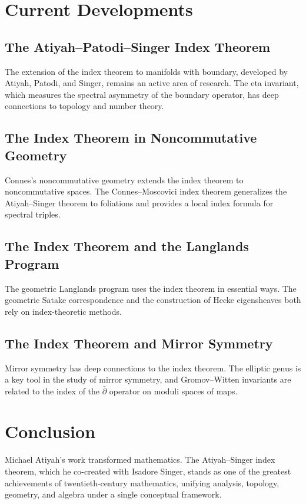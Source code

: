 \section{Current Developments}

\subsection{The Atiyah--Patodi--Singer Index Theorem}

The extension of the index theorem to manifolds with boundary, developed by Atiyah, Patodi, and Singer, remains an active area of research. The eta invariant, which measures the spectral asymmetry of the boundary operator, has deep connections to topology and number theory.

\subsection{The Index Theorem in Noncommutative Geometry}

Connes's noncommutative geometry extends the index theorem to noncommutative spaces. The Connes--Moscovici index theorem generalizes the Atiyah--Singer theorem to foliations and provides a local index formula for spectral triples.

\subsection{The Index Theorem and the Langlands Program}

The geometric Langlands program uses the index theorem in essential ways. The geometric Satake correspondence and the construction of Hecke eigensheaves both rely on index-theoretic methods.

\subsection{The Index Theorem and Mirror Symmetry}

Mirror symmetry has deep connections to the index theorem. The elliptic genus is a key tool in the study of mirror symmetry, and Gromov--Witten invariants are related to the index of the $\bar\partial$ operator on moduli spaces of maps.

\section{Conclusion}

Michael Atiyah's work transformed mathematics. The Atiyah--Singer index theorem, which he co-created with Isadore Singer, stands as one of the greatest achievements of twentieth-century mathematics, unifying analysis, topology, geometry, and algebra under a single conceptual framework.

